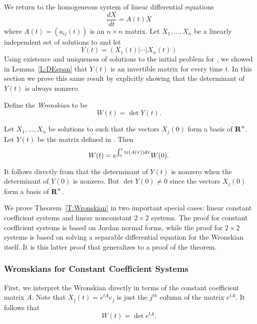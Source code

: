 \documentclass{ximera}
\begin{document}
We return to the homogeneous system of linear differential equations
\arraystart
\begin{equation}  \label{eq:linihsys2}
\frac{dX}{dt}  =  A(t)X
\end{equation}
\arrayfinish
where $A(t)=(a_{ij}(t))$ is an $n\times n$ matrix.  Let $X_1,\ldots,X_n$ be a 
linearly independent set of solutions 
to  and let 
\begin{equation}   \label{E:Y(t)2}
Y(t) = \left(X_1(t)|\cdots |X_n(t)\right) 
\end{equation}
Using existence and uniqueness of solutions to the initial problem for
, we showed in Lemma~\ref{L:DEspan} that $Y(t)$ is an 
invertible matrix for every time $t$.  In this section we prove this same 
result by explicitly showing that the determinant 
of $Y(t)$ is always nonzero.

Define the {\em Wronskian\/} to be
\[
W(t) = \det Y(t).
\]

\begin{thm}  \label{T:Wronskian}
Let $X_1,\ldots,X_n$ be solutions to  such that the vectors
$X_j(0)$ form a basis of $\mbox{$\bf{R}$}^n$.  Let $Y(t)$ be the matrix defined in 
.  Then
\begin{equation}  \label{L:Wronskian}
W(t) = e^{\int_0^t\trace(A(\tau))d\tau}W(0).
\end{equation}
\end{thm}

It follows directly from  that the determinant of $Y(t)$ is 
nonzero when the determinant of $Y(0)$ is nonzero.  But $\det Y(0)\neq 0$ 
since the vectors $X_j(0)$ form a basis of $\mbox{$\bf{R}$}^n$. 

We prove Theorem~\ref{T:Wronskian} in two important special cases: linear 
constant coefficient systems and linear nonconstant $2\times 2$ systems.  
The proof for constant coefficient systems is based on Jordan normal forms, 
while the proof for $2\times 2$ systems is based on solving a separable 
differential equation for the Wronskian itself.  It is this latter proof 
that generalizes to a proof of the theorem.

\subsubsection*{Wronskians for Constant Coefficient Systems}

First, we interpret the Wronskian directly in terms of the constant coefficient 
matrix $A$.  Note that $X_j(t)=e^{tA}e_j$ is just the $j^{th}$ column of the 
matrix $e^{tA}$.   It follows that 
\[
W(t) = \det e^{tA}.
\]
\end{document}
